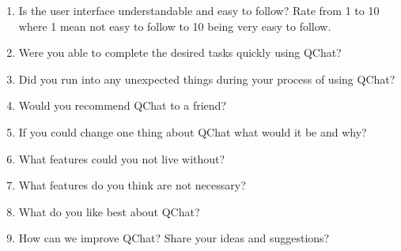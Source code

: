 \documentclass[12pt, titlepage]{article}
\begin{document}
\begin{enumerate}

\item{Is the user interface understandable and easy to follow? Rate from 1 to 10 where 1 mean not easy to follow to 10 being very easy to follow.\\}

\item{Were you able to complete the desired tasks quickly using QChat?\\}

\item{Did you run into any unexpected things during your process of using QChat?\\}

\item{Would you recommend QChat to a friend? \\}

\item{If you could change one thing about QChat what would it be and why?\\}

\item{What features could you not live without?\\}

\item{What features do you think are not necessary?\\}

\item{What do you like best about QChat?\\}

\item{How can we improve QChat? Share your ideas and suggestions?\\}

\end{enumerate}
\end{document}
